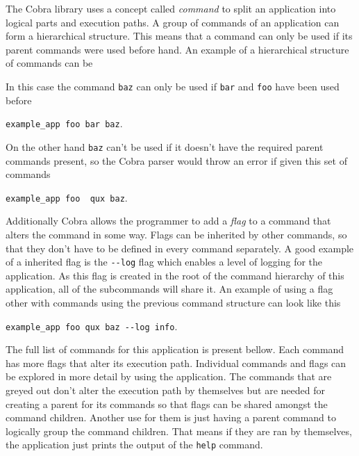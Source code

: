 The Cobra library uses a concept called \textit{command} to split an application into logical parts and execution paths. A group of commands of an application can form a hierarchical structure. This means that a command can only be used if its parent commands were used before hand. An example of a hierarchical structure of commands can be

\vspace{0.5em}
\vspace{0.5em}

\noindent In this case the command \texttt{baz} can only be used if \texttt{bar} and \texttt{foo} have been used before
\begin{center}
  \texttt{example\_app foo bar baz}.
\end{center}
On the other hand \texttt{baz} can't be used if it doesn't have the required parent commands present, so the Cobra parser would throw an error if given this set of commands
\begin{center}
  \texttt{example\_app foo {\color{red} qux} baz}.
\end{center}
Additionally Cobra allows the programmer to add a \textit{flag} to a command that alters the command in some way. Flags can be inherited by other commands, so that they don't have to be defined in every command separately. A good example of a inherited flag is the \texttt{-\--log} flag which enables a level of logging for the application. As this flag is created in the root of the command hierarchy of this application, all of the subcommands will share it. An example of using a flag other with commands using the previous command structure can look like this
\begin{center}
  \texttt{example\_app foo qux baz -\--log info}.
\end{center}

The full list of commands for this application is present bellow. Each command has more flags that alter its execution path. Individual commands and flags can be explored in more detail by using the application. The commands that are greyed out don't alter the execution path by themselves but are needed for creating a parent for its commands so that flags can be shared amongst the command children. Another use for them is just having a parent command to logically group the command children. That means if they are ran by themselves, the application just prints the output of the \texttt{help} command.

\vspace{0.5em}
